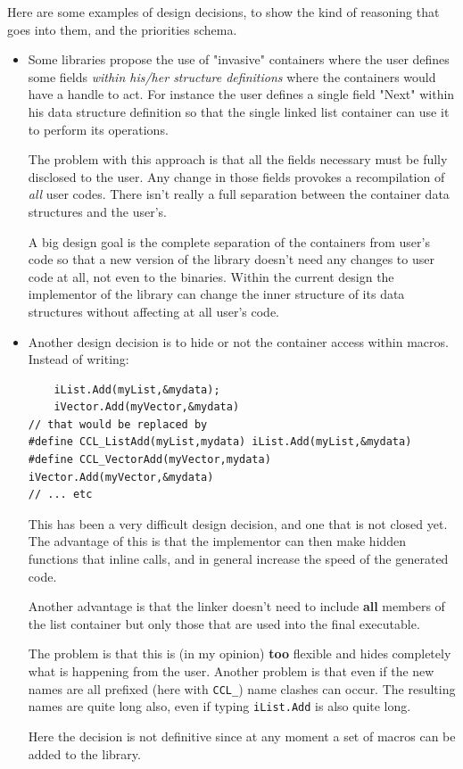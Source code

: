 Here are some examples of design decisions, to show the kind of reasoning that goes into them,
and the priorities schema.
\begin{itemize}
\item Some libraries propose the use of "invasive" containers where the user defines
some fields \textsl{within his/her structure definitions} where the containers
would have a handle to act. For instance the user defines a single field "Next" within
his data structure definition so that the single linked list container can use it
to perform its operations.

The problem with this approach is that all the fields necessary must be fully disclosed
to the user. Any change in those fields provokes a recompilation of \textsl{all} user
codes. There isn't really a full separation between the container data structures
and the user's.

A big design goal is the complete separation of the containers from user's code so that
a new version of the library doesn't need any changes to user code at all, not even
to the binaries. Within the current design the implementor of the library can change
the inner structure of its data structures without affecting at all user's code.

\item Another design decision is to hide or not the container access within macros. Instead
of writing: 
\begin{verbatim}
    iList.Add(myList,&mydata);
    iVector.Add(myVector,&mydata) 
// that would be replaced by
#define CCL_ListAdd(myList,mydata) iList.Add(myList,&mydata)
#define CCL_VectorAdd(myVector,mydata) iVector.Add(myVector,&mydata)
// ... etc
\end{verbatim}

This  has been a very difficult design decision, and one that is not closed yet.
The advantage of this is that the implementor can then make hidden functions that
inline calls, and in general increase the speed of the generated code. 

Another advantage is that the linker
doesn't need to include \textbf{all} members of the list container but only
those that are used into the final executable.

The problem is that this is (in my opinion) \textbf{too} flexible and hides
completely what is happening from the user. Another problem is that even if the
new names are all prefixed (here with \verb,CCL_,) name clashes can occur. The
resulting names are quite long also, even if typing \verb,iList.Add, is also
quite long.

Here the decision is not definitive since at any moment a set of macros can be added
to the library.
\end{itemize}
